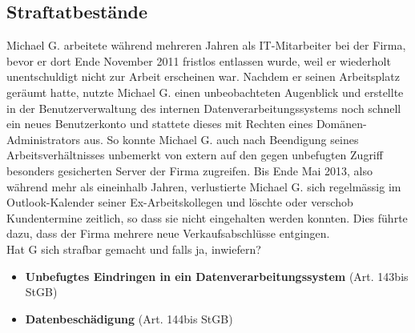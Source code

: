 \subsection{Straftatbestände}
Michael G. arbeitete während mehreren Jahren als IT-Mitarbeiter bei der Firma, bevor er dort Ende November 2011 fristlos entlassen wurde, weil er wiederholt unentschuldigt nicht zur Arbeit erscheinen war. Nachdem er seinen Arbeitsplatz geräumt hatte, nutzte Michael G. einen unbeobachteten Augenblick und erstellte in der Benutzerverwaltung des internen Datenverarbeitungssystems noch schnell ein neues Benutzerkonto und stattete dieses mit Rechten eines Domänen-Administrators aus. So konnte Michael G. auch nach Beendigung seines Arbeitsverhältnisses unbemerkt von extern auf den gegen unbefugten Zugriff besonders gesicherten Server der Firma zugreifen. Bis Ende Mai 2013, also während mehr als eineinhalb Jahren, verlustierte Michael G. sich regelmässig im Outlook-Kalender seiner Ex-Arbeitskollegen und löschte oder verschob Kundentermine zeitlich, so dass sie nicht eingehalten werden konnten. Dies führte dazu, dass der Firma mehrere neue Verkaufsabschlüsse
entgingen.\\
Hat G sich strafbar gemacht und falls ja, inwiefern?
\begin{itemize}
	\item \textbf{Unbefugtes Eindringen in ein Datenverarbeitungssystem} (Art. 143bis StGB)
	\item \textbf{Datenbeschädigung} (Art. 144bis StGB)
\end{itemize}